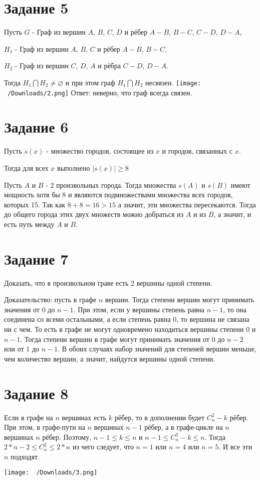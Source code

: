 \documentclass[a4paper, 12pt]{article}
\begin{document}
	\section*{Задание 5}
	    Пусть $G$ - Граф из вершин $A$, $B$, $C$, $D$ и рёбер $A-B$, $B-C$, $C-D$, $D-A$,\par
	    $H_1$ - Граф из вершин $A$, $B$, $C$ и рёбер $A-B$, $B-C$,\par
	    $H_2$ - Граф из вершин $C$, $D$, $A$ и рёбра $C-D$, $D-A$.\par
	    Тогда $H_1\bigcap H_2\neq \varnothing$ и при этом граф  $H_1\bigcap H_2$ несвязен.
        \texttt{[image: ~/Downloads/2.png]}
        Ответ: неверно, что граф всегда связен.
	\section*{Задание 6}
	    Пусть $s(x)$ - множество городов, состоящее из $x$ и городов, связанных с $x$.\par
	    Тогда для всех $x$ выполнено $|s(x)|\geq8$\par
	    Пусть $A$ и $B$ - 2 произвольных города. Тогда множества $s(A)$ и $s(B)$ имеют мощность хотя бы 8 и являются подмножествами множества всех городов, которых 15. Так как $8+8=16>15$ а значит, эти множества пересекаются. Тогда до общего города этих двух множеств можно добраться из $A$ и из $B$, а значит, и есть путь между $A$ и $B$.
	\section*{Задание 7}
		Доказать, что в произвольном граве есть 2 вершины одной степени.\par
		Доказательство: пусть в графе $n$ вершин. Тогда степени вершин могут принимать значения от $0$ до $n-1$. При этом, если у вершины степень равна $n-1$, то она соединена со всеми остальными, а если степень равна $0$, то вершина не связана ни с чем. То есть в графе не могут одновремено находиться вершины степени $0$ и $n-1$. Тогда степени вершин в графе могут принимать значения от $0$ до $n-2$ или от $1$ до $n-1$. В обоих случаях набор значений для степеней вершин меньше, чем количество вершин, а значит, найдутся вершины одной степени.
	\section*{Задание 8}
		Если в графе на $n$ вершинах есть $k$ рёбер, то в дополнении будет $C_n^2-k$ рёбер. При этом, в графе-пути на $n$ вершинах $n-1$ рёбер, а в графе-цикле на $n$ вершинах $n$ рёбер. Поэтому, $n-1\leq k\leq n$ и $n-1\leq C_n^2-k\leq n$. Тогда $2*n-2\leq C_n^2\leq 2*n$ из чего следует, что $n=1$ или $n=4$ или $n=5$. И все эти $n$ подходят.\par \par \par
        \texttt{[image: ~/Downloads/3.png]}
\end{document}
